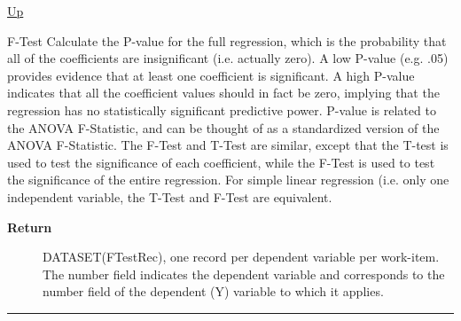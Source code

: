 \hyperlink{ecldoc:linearregression.ols}{Up}

\par
F-Test Calculate the P-value for the full regression, which is the probability that all of the coefficients are insignificant (i.e. actually zero). A low P-value (e.g. .05) provides evidence that at least one coefficient is significant. A high P-value indicates that all the coefficient values should in fact be zero, implying that the regression has no statistically significant predictive power. P-value is related to the ANOVA F-Statistic, and can be thought of as a standardized version of the ANOVA F-Statistic. The F-Test and T-Test are similar, except that the T-test is used to test the significance of each coefficient, while the F-Test is used to test the significance of the entire regression. For simple linear regression (i.e. only one independent variable, the T-Test and F-Test are equivalent.

\par
\begin{description}
\item [\textbf{Return}] DATASET(FTestRec), one record per dependent variable per work-item. The number field indicates the dependent variable and corresponds to the number field of the dependent (Y) variable to which it applies.
\end{description}

\rule{\textwidth}{0.4pt}


